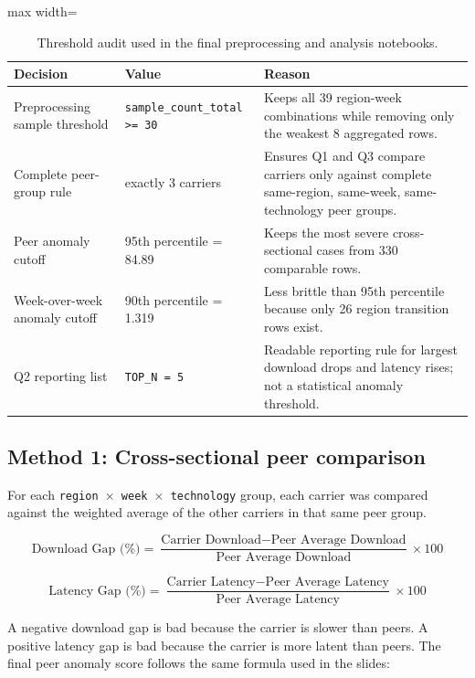 \documentclass[12pt,a4paper]{article}
\begin{document}
\begin{table}[htbp]
\centering
\small
\begin{adjustbox}{max width=\textwidth}
\begin{tabular}{p{4.1cm}p{4.0cm}p{7cm}}
\toprule
Decision & Value & Reason \\
\midrule
Preprocessing sample threshold & \texttt{sample\_count\_total >= 30} & Keeps all 39 region-week combinations while removing only the weakest 8 aggregated rows. \\
Complete peer-group rule & exactly 3 carriers & Ensures Q1 and Q3 compare carriers only against complete same-region, same-week, same-technology peer groups. \\
Peer anomaly cutoff & 95th percentile = 84.89 & Keeps the most severe cross-sectional cases from 330 comparable rows. \\
Week-over-week anomaly cutoff & 90th percentile = 1.319 & Less brittle than 95th percentile because only 26 region transition rows exist. \\
Q2 reporting list & \texttt{TOP\_N = 5} & Readable reporting rule for largest download drops and latency rises; not a statistical anomaly threshold. \\
\bottomrule
\end{tabular}
\end{adjustbox}
\caption{Threshold audit used in the final preprocessing and analysis notebooks.}
\label{tab:thresholds}
\end{table}

\subsection{Method 1: Cross-sectional peer comparison}

For each \texttt{region $\times$ week $\times$ technology} group, each carrier was compared against the weighted average of the other carriers in that same peer group.

\[
\text{Download Gap (\%)} =
\frac{\text{Carrier Download} - \text{Peer Average Download}}{\text{Peer Average Download}} \times 100
\]

\[
\text{Latency Gap (\%)} =
\frac{\text{Carrier Latency} - \text{Peer Average Latency}}{\text{Peer Average Latency}} \times 100
\]

A negative download gap is bad because the carrier is slower than peers. A positive latency gap is bad because the carrier is more latent than peers. The final peer anomaly score follows the same formula used in the slides:
\end{document}

